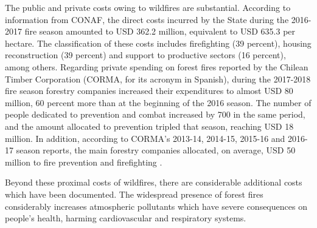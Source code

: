 \documentclass[11pt]{article}
\begin{document}
\begin{spacing}{1.5}

The public and private costs owing to wildfires are substantial.  According to information from CONAF, the direct costs incurred by the State during the 2016-2017 fire season amounted to USD 362.2 million, equivalent to USD 635.3 per hectare. The classification of these costs includes firefighting (39 percent), housing reconstruction (39 percent) and support to productive sectors (16 percent), among others. Regarding private spending on forest fires reported by the Chilean Timber Corporation (CORMA, for its acronym in Spanish), during the 2017-2018 fire season forestry companies increased their expenditures to almost USD 80 million, 60 percent more than at the beginning of the 2016 season. The number of people dedicated to prevention and combat increased by 700 in the same period, and the amount allocated to prevention tripled that season, reaching USD 18 million. In addition, according to CORMA's 2013-14, 2014-15, 2015-16 and 2016-17 season reports, the main forestry companies allocated, on average, USD 50 million to fire prevention and firefighting \citep{CR2}.


Beyond these proximal costs of wildfires, there are considerable additional costs which have been documented.  The widespread presence of forest fires considerably increases atmospheric pollutants which have severe consequences on people's health, harming cardiovascular and respiratory systems. %


\end{spacing}
\end{document}
